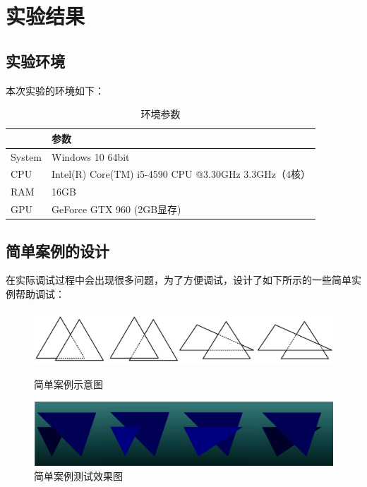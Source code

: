 \documentclass[10pt]{article}
\begin{document}
\section{实验结果}
\subsection{实验环境}
本次实验的环境如下：
\begin{table}[H]
\caption{环境参数}
\begin{center}
\begin{tabular}{ll}
\toprule  %
& 参数\\
\midrule  %
System& Windows 10 64bit \\
CPU& Intel(R) Core(TM) i5-4590 CPU @3.30GHz 3.3GHz（4核）\\
RAM& 16GB\\
GPU& GeForce GTX 960 (2GB显存)\\
\bottomrule %
\end{tabular}
\end{center}
\end{table}
\subsection{简单案例的设计}
在实际调试过程中会出现很多问题，为了方便调试，设计了如下所示的一些简单实例帮助调试：
\begin{figure}[H]
\setlength{\abovecaptionskip}{2pt}
\setlength{\belowcaptionskip}{20pt}
\begin{center}
\includegraphics[scale=0.6]{cases1.png}
\caption{简单案例示意图}
\includegraphics[scale=0.5]{cases2.png}
\caption{简单案例测试效果图}
\end{center}
\end{figure}
\end{document}
